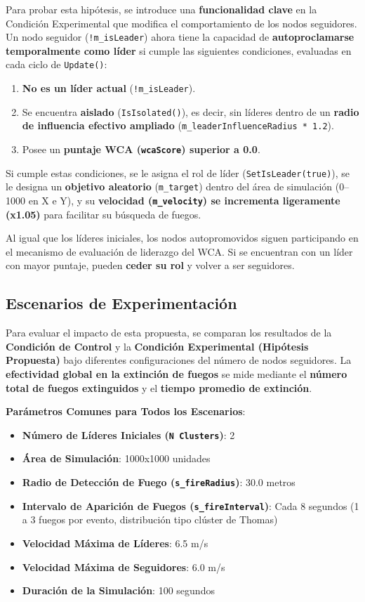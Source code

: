\documentclass{article}
\begin{document}
Para probar esta hipótesis, se introduce una \textbf{funcionalidad clave} en la Condición Experimental que modifica el comportamiento de los nodos seguidores. Un nodo seguidor (\texttt{!m\_isLeader}) ahora tiene la capacidad de \textbf{autoproclamarse temporalmente como líder} si cumple las siguientes condiciones, evaluadas en cada ciclo de \texttt{Update()}:

\begin{enumerate}
  \item \textbf{No es un líder actual} (\texttt{!m\_isLeader}).
  \item Se encuentra \textbf{aislado} (\texttt{IsIsolated()}), es decir, sin líderes dentro de un \textbf{radio de influencia efectivo ampliado} (\texttt{m\_leaderInfluenceRadius * 1.2}).
  \item Posee un \textbf{puntaje WCA (\texttt{wcaScore}) superior a 0.0}.
\end{enumerate}

Si cumple estas condiciones, se le asigna el rol de líder (\texttt{SetIsLeader(true)}), se le designa un \textbf{objetivo aleatorio} (\texttt{m\_target}) dentro del área de simulación (0--1000 en X e Y), y su \textbf{velocidad (\texttt{m\_velocity}) se incrementa ligeramente (x1.05)} para facilitar su búsqueda de fuegos.

Al igual que los líderes iniciales, los nodos autopromovidos siguen participando en el mecanismo de evaluación de liderazgo del WCA. Si se encuentran con un líder con mayor puntaje, pueden \textbf{ceder su rol} y volver a ser seguidores.

\subsection*{Escenarios de Experimentación}

Para evaluar el impacto de esta propuesta, se comparan los resultados de la \textbf{Condición de Control} y la \textbf{Condición Experimental (Hipótesis Propuesta)} bajo diferentes configuraciones del número de nodos seguidores. La \textbf{efectividad global en la extinción de fuegos} se mide mediante el \textbf{número total de fuegos extinguidos} y el \textbf{tiempo promedio de extinción}.

\textbf{Parámetros Comunes para Todos los Escenarios}:

\begin{itemize}
  \item \textbf{Número de Líderes Iniciales (\texttt{N Clusters})}: 2
  \item \textbf{Área de Simulación}: 1000x1000 unidades
  \item \textbf{Radio de Detección de Fuego (\texttt{s\_fireRadius})}: 30.0 metros
  \item \textbf{Intervalo de Aparición de Fuegos (\texttt{s\_fireInterval})}: Cada 8 segundos (1 a 3 fuegos por evento, distribución tipo clúster de Thomas)
  \item \textbf{Velocidad Máxima de Líderes}: 6.5 m/s
  \item \textbf{Velocidad Máxima de Seguidores}: 6.0 m/s
  \item \textbf{Duración de la Simulación}: 100 segundos
\end{itemize}
\end{document}
